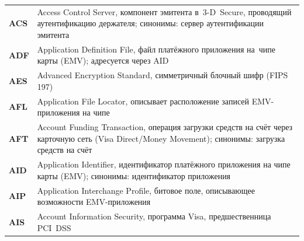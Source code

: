 \begin{longtable}{@{}p{4.5em}p{\dimexpr\linewidth-4.5em-2\tabcolsep\relax}@{}}
  \textbf{ACS}               & Access Control Server, компонент эмитента в~3-D~Secure, проводящий аутентификацию держателя; синонимы: сервер аутентификации эмитента                                                                                                                                                            \\
  \textbf{ADF}               & Application Definition File, файл платёжного приложения на~чипе карты (EMV); адресуется через AID                                                                                                                                                                                               \\
  \textbf{AES}               & Advanced Encryption Standard, симметричный блочный шифр (FIPS 197)                                                                                                                                                                                                                               \\
  \textbf{AFL}               & Application File Locator, описывает расположение записей EMV-приложения на чипе                                                                                                                                                                                                                  \\
  \textbf{AFT}               & Account Funding Transaction, операция загрузки средств на счёт через карточную сеть (Visa Direct/Money Movement); синонимы: загрузка средств на счёт                                                                                                                                              \\
  \textbf{AID}               & Application Identifier, идентификатор платёжного приложения на чипе карты (EMV); синонимы: идентификатор приложения                                                                                                                                                                               \\
  \textbf{AIP}               & Application Interchange Profile, битовое поле, описывающее возможности EMV-приложения                                                                                                                                                                                                            \\
  \textbf{AIS}               & Account Information Security, программа Visa, предшественница PCI~DSS                                                                                                                                                                                                                            \\

\end{longtable}
